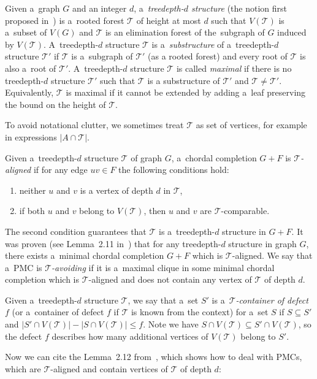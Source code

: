 \documentclass[11pt,a4paper]{article}
\theoremstyle{definition}
\def\T{\mathcal{T}}
\begin{document}
Given a~graph $G$ and an integer $d$, a~{\it treedepth-$d$ structure} (the notion first proposed in~\cite{DBLP:conf/soda/ChudnovskyMPPR24}) is a~rooted forest $\T$ of height at most $d$ such that $V(\T)$ is a~subset of $V(G)$ and $\T$ is an elimination forest of the~subgraph of $G$ induced by $V(\T)$. 
A~treedepth-$d$ structure $\T$ is a~\emph{substructure} of a~treedepth-$d$ structure $\T'$
if $\T$ is a~subgraph of $\T'$ (as a rooted forest) and every root of $\T$ is also a~root of $\T'$. 
A~treedepth-$d$ structure $\T$ is called {\it maximal} if there is no treedepth-$d$ structure $\T'$ such that $\T$ is a substructure of $\T'$ and $\T \neq \T'$. Equivalently, $\T$ is maximal if it cannot be extended by adding a~leaf preserving the bound on the height of $\T$.

To avoid notational clutter, we sometimes treat $\T$ as set of vertices, for example in expressions $|A \cap \T|$.

Given a~treedepth-$d$ structure $\T$ of graph $G$, a~chordal completion $G+F$ is {\it $\T$-aligned} if for any edge $uv\in F$ the following conditions hold:
\begin{enumerate}
    \item neither $u$ and $v$ is a vertex of depth $d$ in $\T$,
    \item if both $u$ and $v$ belong to $V(\T)$, then $u$ and $v$ are $\T$-comparable.
\end{enumerate}
The second condition guarantees that $\T$ is a~treedepth-$d$ structure in $G+F$. It was proven (see Lemma~2.11 in~\cite{DBLP:conf/soda/ChudnovskyMPPR24}) that for any treedepth-$d$ structure in graph $G$, there exists a~minimal chordal completion $G+F$ which is $\T$-aligned.  
We say that a~PMC is $\T${\it -avoiding} if it is a~maximal clique in some minimal chordal completion which is $\T$-aligned and does not contain any vertex of $\T$ of depth $d$. 

Given a~treedepth-$d$ structure $\T$, we say that a~set $S'$ is a~$\T${\it -container of defect }$f$ (or a~container of defect $f$ if $\T$ is known from the context) for a~set $S$ if $S\subseteq S'$ and $|S'\cap V(\T)| - |S\cap V(\T)| \leq f$. Note we have $S\cap V(\T)\subseteq S'\cap V(\T)$, so the defect $f$ describes how many additional vertices of $V(\T)$ belong to $S'$. 

Now we can cite the Lemma~2.12 from~\cite{DBLP:conf/soda/ChudnovskyMPPR24}, which shows how to deal with PMCs, which are $\T$-aligned and contain vertices of $\T$ of depth $d$:
\end{document}
